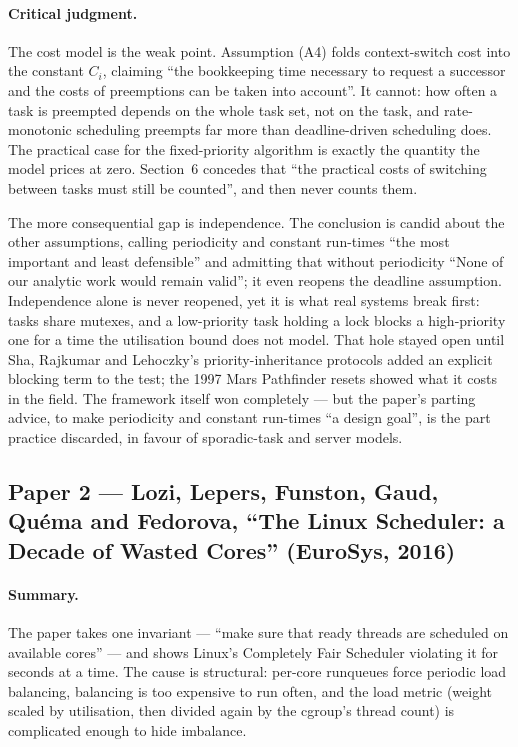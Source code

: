 \paragraph{Critical judgment.}
The cost model is the weak point. Assumption (A4) folds context-switch cost into the
constant $C_i$, claiming ``the bookkeeping time necessary to request a successor and the
costs of preemptions can be taken into account''. It cannot: how often a task is
preempted depends on the whole task set, not on the task, and rate-monotonic scheduling
preempts far more than deadline-driven scheduling does. The practical case for the
fixed-priority algorithm is exactly the quantity the model prices at zero. Section~6
concedes that ``the practical costs of switching between tasks must still be counted'',
and then never counts them.

The more consequential gap is independence. The conclusion is candid about the other
assumptions, calling periodicity and constant run-times ``the most important and least
defensible'' and admitting that without periodicity ``None of our analytic work would
remain valid''; it even reopens the deadline assumption. Independence alone is never
reopened, yet it is what real systems break first: tasks share mutexes, and a
low-priority task holding a lock blocks a high-priority one for a time the utilisation
bound does not model. That hole stayed open until Sha, Rajkumar and Lehoczky's
priority-inheritance protocols added an explicit blocking term to the test; the 1997
Mars Pathfinder resets showed what it costs in the field. The framework itself won
completely --- but the paper's parting advice, to make periodicity and constant
run-times ``a design goal'', is the part practice discarded, in favour of sporadic-task
and server models.

\subsection*{Paper 2 --- Lozi, Lepers, Funston, Gaud, Qu\'ema and Fedorova,
``The Linux Scheduler: a Decade of Wasted Cores'' (EuroSys, 2016)}

\paragraph{Summary.}
The paper takes one invariant --- ``make sure that ready threads are scheduled on
available cores'' --- and shows Linux's Completely Fair Scheduler violating it for
seconds at a time. The cause is structural: per-core runqueues force periodic load
balancing, balancing is too expensive to run often, and the load metric (weight scaled
by utilisation, then divided again by the cgroup's thread count) is complicated enough
to hide imbalance.

